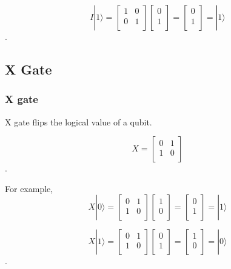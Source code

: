 \begin{equation}
I|1\rangle = \begin{bmatrix}
1 & 0 \\
0 & 1 \\
\end{bmatrix} 
\left[
\begin{array}{c}
0 \\
1  \\
\end{array}
\right]
= \left[
\begin{array}{c}
0 \\
1 \\
\end{array}
\right]
= |1\rangle
\end{equation}.

\subsection{X Gate}
\subsubsection{X gate}

X gate flips the logical value of a qubit.

\begin{equation}
X = \begin{bmatrix}
0 & 1 \\
1 & 0 \\
\end{bmatrix}
\end{equation}.

For example,
\begin{equation}
X|0\rangle = \begin{bmatrix}
0 & 1 \\
1 & 0 \\
\end{bmatrix} 
\left[
\begin{array}{c}
1 \\
0 \\
\end{array}
\right]
= \left[
\begin{array}{c}
0 \\
1 \\
\end{array}
\right]
= |1\rangle
\end{equation}

\begin{equation}
 X|1\rangle = \begin{bmatrix}
0 & 1 \\
1 & 0 \\
\end{bmatrix} 
\left[
\begin{array}{c}
0 \\
1  \\
\end{array}
\right]
= \left[
\begin{array}{c}
1 \\
0 \\
\end{array}
\right]
= |0\rangle
\end{equation}.

